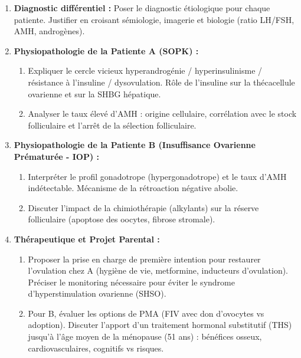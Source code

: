 \documentclass[11pt]{article}
\begin{document}
\begin{exercice}
\begin{enumerate}
    \item \textbf{Diagnostic différentiel :} Poser le diagnostic étiologique pour chaque patiente. Justifier en croisant sémiologie, imagerie et biologie (ratio LH/FSH, AMH, androgènes).
    \item \textbf{Physiopathologie de la Patiente A (SOPK) :} 
    \begin{enumerate}
        \item Expliquer le cercle vicieux hyperandrogénie / hyperinsulinisme / résistance à l'insuline / dysovulation. Rôle de l'insuline sur la thécacellule ovarienne et sur la SHBG hépatique.
        \item Analyser le taux élevé d'AMH : origine cellulaire, corrélation avec le stock folliculaire et l'arrêt de la sélection folliculaire.
    \end{enumerate}
    \item \textbf{Physiopathologie de la Patiente B (Insuffisance Ovarienne Prématurée - IOP) :} 
    \begin{enumerate}
        \item Interpréter le profil gonadotrope (hypergonadotrope) et le taux d'AMH indétectable. Mécanisme de la rétroaction négative abolie.
        \item Discuter l'impact de la chimiothérapie (alkylants) sur la réserve folliculaire (apoptose des oocytes, fibrose stromale).
    \end{enumerate}
    \item \textbf{Thérapeutique et Projet Parental :} 
    \begin{enumerate}
        \item Proposer la prise en charge de première intention pour restaurer l'ovulation chez A (hygiène de vie, metformine, inducteurs d'ovulation). Préciser le monitoring nécessaire pour éviter le syndrome d'hyperstimulation ovarienne (SHSO).
        \item Pour B, évaluer les options de PMA (FIV avec don d'ovocytes vs adoption). Discuter l'apport d'un traitement hormonal substitutif (THS) jusqu'à l'âge moyen de la ménopause (51 ans) : bénéfices osseux, cardiovasculaires, cognitifs vs risques.
    \end{enumerate}
\end{enumerate}
\end{exercice}
\end{document}
